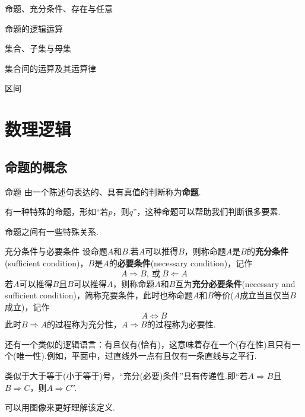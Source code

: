 \documentclass[lang=cn, zihao=5]{elegantbook}
\begin{document}
\begin{introduction}
	\item 命题、充分条件、存在与任意
	\item 命题的逻辑运算
	\item 集合、子集与母集
	\item 集合间的运算及其运算律
	\item 区间
\end{introduction}

\section{数理逻辑}

\subsection{命题的概念}

\begin{definition}{命题}
	由一个陈述句表达的、具有真值的判断称为\textbf{命题}.
\end{definition}
\begin{remark}
	有一种特殊的命题，形如“若$p$，则$q$”，这种命题可以帮助我们判断很多要素.
\end{remark}

命题之间有一些特殊关系.

\begin{definition}{充分条件与必要条件} %
	设命题$A$和$B$.若$A$可以推得$B$，则称命题$A$是$B$的\textbf{充分条件}(sufficient condition)，$B$是$A$的\textbf{必要条件}(necessary condition)，记作$$A \Rightarrow B,~\text{或}~B \Leftarrow A$$
	若$A$可以推得$B$且$B$可以推得$A$，则称命题$A$和$B$互为\textbf{充分必要条件}(necessary and sufficient condition)，简称充要条件，此时也称命题$A$和$B$等价($A$成立当且仅当$B$成立)，记作$$A \Leftrightarrow B$$
	此时$B \Rightarrow A$的过程称为充分性，$A \Rightarrow B$的过程称为必要性.
\end{definition}
\begin{remark}
	还有一个类似的逻辑语言：有且仅有(恰有)，这意味着存在一个(存在性)且只有一个(唯一性).例如，平面中，过直线外一点有且仅有一条直线与之平行.
\end{remark}
\begin{remark}
	类似于大于等于(小于等于)号，“充分(必要)条件”具有传递性.即“若$A \Rightarrow B$且$B \Rightarrow C$，则$A \Rightarrow C$”.
\end{remark}

可以用图像来更好理解该定义.
\end{document}
